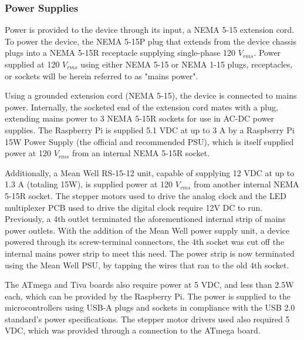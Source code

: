 \documentclass[11pt]{article}
\begin{document}
\subsubsection{Power Supplies}
\label{PowerDesign}
Power is provided to the device through its input, a NEMA 5-15 extension cord. 
To power the device, the NEMA 5-15P plug that extends from the device chassis plugs into a NEMA 5-15R receptacle supplying single-phase 120 $V_{rms}$. 
Power supplied at 120 $V_{rms}$ using either NEMA 5-15 or NEMA 1-15 plugs, receptacles, or sockets will be herein referred to as "mains power".

Using a grounded extension cord (NEMA 5-15), the device is connected to mains power. 
Internally, the socketed end of the extension cord mates with a plug, extending mains power to 3 NEMA 5-15R sockets for use in AC-DC power supplies. 
The Raspberry Pi is supplied 5.1 VDC at up to 3 A by a Raspberry Pi 15W Power Supply (the official and recommended PSU), which is itself supplied power at 120 $V_{rms}$ from an internal NEMA 5-15R socket.

Additionally, a Mean Well RS-15-12 unit, capable of supplying 12 VDC at up to 1.3 A (totaling 15W), is supplied power at 120 $V_{rms}$ from another internal NEMA 5-15R socket. 
The stepper motors used to drive the analog clock and the LED multiplexer PCB used to drive the digital clock require 12V DC to run.
Previously, a 4th outlet terminated the aforementioned internal strip of mains power outlets. 
With the addition of the Mean Well power supply unit, a device powered through its screw-terminal connectors, the 4th socket was cut off the internal mains power strip to meet this need. 
The power strip is now terminated using the Mean Well PSU, by tapping the wires that ran to the old 4th socket.

The ATmega and Tiva boards also require power at 5 VDC, and less than 2.5W each, which can be provided by the Raspberry Pi. 
The power is supplied to the microcontrollers using USB-A plugs and sockets in compliance with the USB 2.0 standard's power specifications. 
The stepper motor drivers used also required 5 VDC, which was provided through a connection to the ATmega board. 
\end{document}
